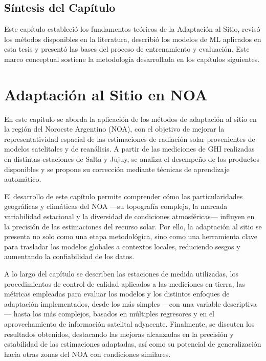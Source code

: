 \documentclass[letterpaper,12pt, twoside]{report}
\makeatletter
\let\newtitle\@title
\providecommand{\DIFdeltex}[1]{{\protect\color{red} \scriptsize #1}} %
\providecommand{\DIFaddbegin}{} %
\providecommand{\DIFaddend}{} %
\providecommand{\DIFdelbegin}{} %
\providecommand{\DIFdelend}{} %
\providecommand{\DIFdel}[1]{\texorpdfstring{\DIFdeltex{#1}}{}} %
\newcommand{\DIFscaledelfig}{0.5}
\newlength{\DIFdelgraphicswidth} %
\newlength{\DIFdelgraphicsheight} %
\newcommand{\DIFaddincludegraphics}[2][]{{\color{blue}\fbox{\DIFOincludegraphics[#1]{#2}}}} %
\newcommand{\DIFdelincludegraphics}[2][]{%
\sbox{\DIFdelgraphicsbox}{\DIFOincludegraphics[#1]{#2}}%
\settoboxwidth{\DIFdelgraphicswidth}{\DIFdelgraphicsbox} %
\settoboxtotalheight{\DIFdelgraphicsheight}{\DIFdelgraphicsbox} %
\scalebox{\DIFscaledelfig}{%
\parbox[b]{\DIFdelgraphicswidth}{\usebox{\DIFdelgraphicsbox}\\[-\baselineskip] \rule{\DIFdelgraphicswidth}{0em}}\llap{\resizebox{\DIFdelgraphicswidth}{\DIFdelgraphicsheight}{%
\setlength{\unitlength}{\DIFdelgraphicswidth}%
\begin{picture}(1,1)%
\thicklines\linethickness{2pt} %
{\color[rgb]{1,0,0}\put(0,0){\framebox(1,1){}}}%
{\color[rgb]{1,0,0}\put(0,0){\line( 1,1){1}}}%
{\color[rgb]{1,0,0}\put(0,1){\line(1,-1){1}}}%
\end{picture}%
}\hspace*{3pt}}} %
} %
\DeclareRobustCommand{\DIFaddbegin}{\DIFOaddbegin \let\includegraphics\DIFaddincludegraphics} %
\DeclareRobustCommand{\DIFaddend}{\DIFOaddend \let\includegraphics\DIFOincludegraphics} %
\DeclareRobustCommand{\DIFdelbegin}{\DIFOdelbegin \let\includegraphics\DIFdelincludegraphics} %
\DeclareRobustCommand{\DIFdelend}{\DIFOaddend \let\includegraphics\DIFOincludegraphics} %
\makeatother
\begin{document}
\section{\DIFdel{Síntesis del Capítulo}}
\addtocounter{section}{-1}%
\DIFdel{Este capítulo estableció los fundamentos teóricos de la Adaptación al Sitio, revisó los métodos disponibles en la literatura, describió los modelos de ML aplicados en esta tesis y presentó las bases del proceso de entrenamiento y evaluación. Este marco conceptual sostiene la metodología desarrollada en los capítulos siguientes.
}%

\DIFdelend \DIFaddbegin  \DIFaddend %
\DIFdelbegin %
\chapter{\DIFdel{Adaptación al Sitio en NOA}}%
\addtocounter{chapter}{-1}%

\DIFdel{En este capítulo se aborda la aplicación de los métodos de adaptación al sitio en la región del Noroeste Argentino (NOA), con el objetivo de mejorar la representatividad espacial de las estimaciones de radiación solar provenientes de modelos satelitales y de reanálisis. A partir de las mediciones de GHI realizadas en distintas estaciones de Salta y Jujuy, se analiza el desempeño de los productos disponibles y se propone su corrección mediante técnicas de aprendizaje automático.
}%

\DIFdel{El desarrollo de este capítulo permite comprender cómo las particularidades geográficas y climáticas del NOA —su topografía compleja, la marcada variabilidad estacional y la diversidad de condiciones atmosféricas— influyen en la precisión de las estimaciones del recurso solar. Por ello, la adaptación al sitio se presenta no solo como una etapa metodológica, sino como una herramienta clave para trasladar los modelos globales a contextos locales, reduciendo sesgos y aumentando la confiabilidad de los datos.
}%

\DIFdel{A lo largo del capítulo se describen las estaciones de medida utilizadas, los procedimientos de control de calidad aplicados a las mediciones en tierra, las métricas empleadas para evaluar los modelos y los distintos enfoques de adaptación implementados, desde los más simples —con una variable descriptiva— hasta los más complejos, basados en múltiples regresores y en el aprovechamiento de información satelital adyacente. Finalmente, se discuten los resultados obtenidos, destacando las mejoras alcanzadas en la precisión y estabilidad de las estimaciones adaptadas, así como su potencial de generalización hacia otras zonas del NOA con condiciones similares.
}%
\end{document}
